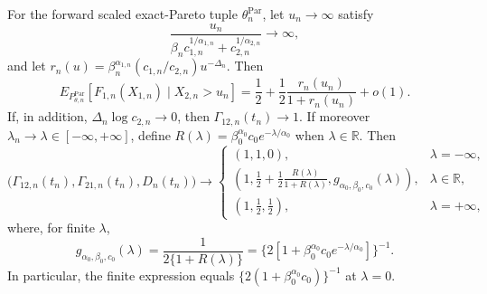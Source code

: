 For the forward scaled exact-Pareto tuple \(\theta_n^{\mathrm{Par}}\), let \(u_n\to\infty\) satisfy
\[
\frac{u_n}{\beta_n c_{1,n}^{1/\alpha_{1,n}}+c_{2,n}^{1/\alpha_{2,n}}}\to\infty,
\]
and let \(r_n(u)=\beta_n^{\alpha_{1,n}}(c_{1,n}/c_{2,n})u^{-\Delta_n}\). Then
\[
E_{P_{\theta,n}^{\mathrm{Par}}}[F_{1,n}(X_{1,n})\mid X_{2,n}>u_n]
=\frac12+\frac12\frac{r_n(u_n)}{1+r_n(u_n)}+o(1).
\]
If, in addition, \(\Delta_n\log c_{2,n}\to0\), then \(\Gamma_{12,n}(t_n)\to1\). If moreover \(\lambda_n\to\lambda\in[-\infty,+\infty]\), define \(R(\lambda)=\beta_0^{\alpha_0}c_0e^{-\lambda/\alpha_0}\) when \(\lambda\in\mathbb R\). Then
\[
\bigl(\Gamma_{12,n}(t_n),\Gamma_{21,n}(t_n),D_n(t_n)\bigr)
\longrightarrow
\begin{cases}
(1,1,0), & \lambda=-\infty,\\
\displaystyle\left(1,\frac12+\frac12\frac{R(\lambda)}{1+R(\lambda)},
g_{\alpha_0,\beta_0,c_0}(\lambda)\right), & \lambda\in\mathbb R,\\
\displaystyle\left(1,\frac12,\frac12\right), & \lambda=+\infty,
\end{cases}
\]
where, for finite \(\lambda\),
\[
g_{\alpha_0,\beta_0,c_0}(\lambda)
=\frac{1}{2\{1+R(\lambda)\}}
=\{2[1+\beta_0^{\alpha_0}c_0e^{-\lambda/\alpha_0}]\}^{-1}.
\]
In particular, the finite expression equals \(\{2(1+\beta_0^{\alpha_0}c_0)\}^{-1}\) at \(\lambda=0\).